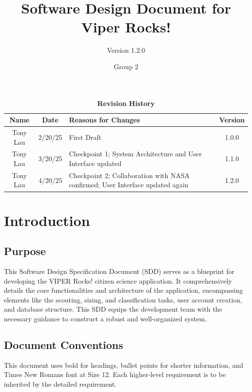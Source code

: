 \documentclass{article}
\begin{document}
\title{Software Design Document for Viper Rocks!}
\author{Version 1.2.0}
\date{Group 2}

\maketitle
\tableofcontents
\newpage

\fancyhf{}
\fancyfoot[C]{\thepage}

\begin{table}[h!]
\centering
\caption{\textbf{Revision History}}
\begin{tabularx}{\textwidth}{|c|c|X|c|}
\hline
\textbf{Name} & \textbf{Date} & \textbf{Reasons for Changes} & \textbf{Version} \\
\hline
Tony Lau & 2/20/25 & First Draft & 1.0.0 \\
\hline
Tony Lau & 3/20/25 & Checkpoint 1; System Architecture and User Interface updated & 1.1.0 \\
\hline
Tony Lau & 4/20/25 & Checkpoint 2; Collaboration with NASA confirmed; User Interface updated again & 1.2.0 \\
\hline

\hline
\end{tabularx}
\end{table}

\section{Introduction}
\subsection{Purpose}
This Software Design Specification Document (SDD) serves as a blueprint for developing the VIPER Rocks! citizen science application. It comprehensively details the core functionalities and architecture of the application, encompassing elements like the scouting, sizing, and classification tasks, user account creation, and database structure. This SDD equips the development team with the necessary guidance to construct a robust and well-organized system.
\subsection{Document Conventions}
This document uses bold for headings, bullet points for shorter information, and Times New Romans font at Size 12. Each higher-level requirement is to be inherited by the detailed requirement.
\end{document}
